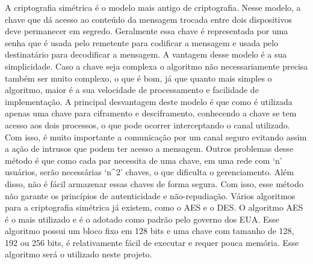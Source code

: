    A criptografia simétrica é o modelo mais antigo de criptografia. Nesse modelo, a chave que dá acesso ao conteúdo da mensagem trocada entre dois dispositivos deve permanecer em segredo. Geralmente essa chave é representada por uma senha que é usada pelo remetente para codificar a mensagem e usada pelo destinatário para decodificar a mensagem. A vantagem desse modelo é a sua simplicidade. Caso a chave seja complexa o algoritmo não necessariamente precisa também ser muito complexo, o que é bom, já que quanto mais simples o algoritmo, maior é a sua velocidade de processamento e facilidade de implementação. A principal desvantagem deste modelo é que como é utilizada apenas uma chave para ciframento e desciframento, conhecendo a chave se tem acesso aos dois processos, o que pode ocorrer interceptando o canal utilizado. Com isso, é muito importante a comunicação por um canal seguro evitando assim a ação de intrusos que podem ter acesso a mensagem. 
       Outros problemas desse método é que como cada par necessita de uma chave, em uma rede com ‘n’ usuários, serão necessárias ‘n^2’ chaves, o que dificulta o gerenciamento. Além disso, não é fácil armazenar essas chaves de forma segura. Com isso, esse método não garante os princípios de autenticidade e não-repudiação. Vários algoritmos para a criptografia simétrica já existem, como o AES e o DES. O algoritmo AES é o mais utilizado e é o adotado como padrão pelo governo dos EUA. Esse algoritmo possui um bloco fixo em 128 bits e uma chave com tamanho de 128, 192 ou 256 bits, é relativamente fácil de executar e requer pouca memória. Esse algoritmo será o utilizado neste projeto.


